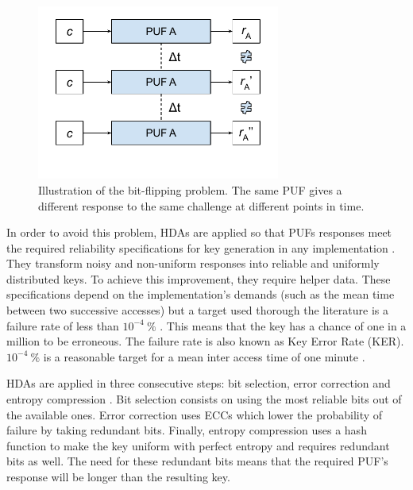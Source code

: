 \begin{figure}[H]
    \centering
    \includegraphics[width=8cm]{images/Unreliability.pdf}
    \caption{Illustration of the bit-flipping problem. The same PUF gives a different response to the same challenge at different points in time. }
    \label{fig:Unreliability}
\end{figure}

In order to avoid this problem, HDAs are applied so that PUFs responses meet the required reliability specifications for key generation in any implementation \cite{Delvaux2015}. They transform noisy and non-uniform responses into reliable and uniformly distributed keys. To achieve this improvement, they require helper data.  These specifications depend on the implementation's demands (such as the mean time between two successive accesses) but a target used thorough the literature is a failure rate of less than $10^{-4}\ \%$ \cite{Bohm2013,Delvaux2015}. This means that the key has a chance of one in a million to be erroneous. The failure rate is also known as Key Error Rate (KER).  $10^{-4}\ \%$ is a reasonable target for a mean inter access time of one minute \cite{Alioto2019}. 

HDAs are applied in three consecutive steps: bit selection, error correction and entropy compression \cite{Delvaux2015}. Bit selection consists on using the most reliable bits out of the available ones. Error correction uses ECCs which lower the probability of failure by taking redundant bits. Finally, entropy compression uses a hash function to make the key uniform with perfect entropy and requires redundant bits as well. The need for these redundant bits means that the required PUF's response will be longer than the resulting key.


